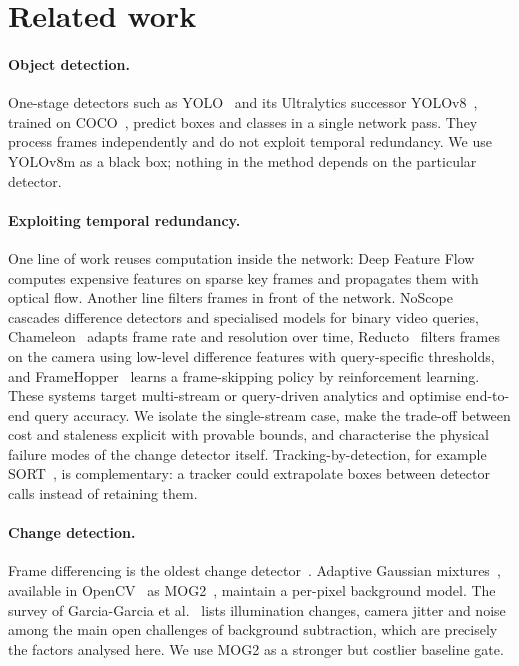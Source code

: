\section{Related work}\label{sec:related}

\paragraph{Object detection.} One-stage detectors such as YOLO~\cite{redmon2016yolo} and its Ultralytics successor YOLOv8~\cite{jocher2023yolov8}, trained on COCO~\cite{lin2014coco}, predict boxes and classes in a single network pass. They process frames independently and do not exploit temporal redundancy. We use YOLOv8m as a black box; nothing in the method depends on the particular detector.

\paragraph{Exploiting temporal redundancy.} One line of work reuses computation inside the network: Deep Feature Flow~\cite{zhu2017dff} computes expensive features on sparse key frames and propagates them with optical flow. Another line filters frames in front of the network. NoScope~\cite{kang2017noscope} cascades difference detectors and specialised models for binary video queries, Chameleon~\cite{jiang2018chameleon} adapts frame rate and resolution over time, Reducto~\cite{li2020reducto} filters frames on the camera using low-level difference features with query-specific thresholds, and FrameHopper~\cite{arefeen2022framehopper} learns a frame-skipping policy by reinforcement learning. These systems target multi-stream or query-driven analytics and optimise end-to-end query accuracy. We isolate the single-stream case, make the trade-off between cost and staleness explicit with provable bounds, and characterise the physical failure modes of the change detector itself. Tracking-by-detection, for example SORT~\cite{bewley2016sort}, is complementary: a tracker could extrapolate boxes between detector calls instead of retaining them.

\paragraph{Change detection.} Frame differencing is the oldest change detector~\cite{jain1979difference}. Adaptive Gaussian mixtures~\cite{stauffer1999adaptive}, available in OpenCV~\cite{bradski2000opencv} as MOG2~\cite{zivkovic2004improved}, maintain a per-pixel background model. The survey of Garcia-Garcia et al.~\cite{garcia2020background} lists illumination changes, camera jitter and noise among the main open challenges of background subtraction, which are precisely the factors analysed here. We use MOG2 as a stronger but costlier baseline gate.

